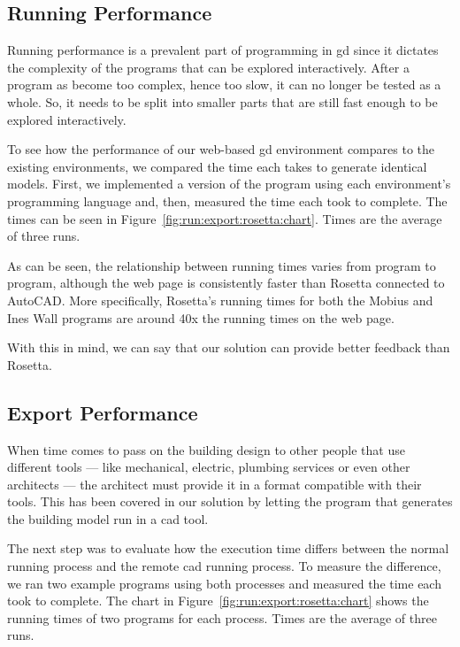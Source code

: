 \subsection{Running Performance}
Running performance is a prevalent part of programming in \gls{gd} since it dictates the complexity of the programs that can be explored interactively.
After a program as become too complex, hence too slow, it can no longer be tested as a whole.
So, it needs to be split into smaller parts that are still fast enough to be explored interactively.

To see how the performance of our web-based \gls{gd} environment compares to the existing environments, we compared the time each takes to generate identical models.
First, we implemented a version of the program using each environment's programming language and, then, measured the time each took to complete.
The times can be seen in Figure~\ref{fig:run:export:rosetta:chart}.
Times are the average of three runs.

As can be seen, the relationship between running times varies from program to program, although the web page is consistently faster than Rosetta connected to AutoCAD.
More specifically, Rosetta's running times for both the Mobius and Ines Wall programs are around 40x the running times on the web page.

With this in mind, we can say that our solution can provide better feedback than Rosetta.



\subsection{Export Performance}
When time comes to pass on the building design to other people that use different tools --- like mechanical, electric, plumbing services or even other architects --- the architect must provide it in a format compatible with their tools.
This has been covered in our solution by letting the program that generates the building model run in a \gls{cad} tool.

The next step was to evaluate how the execution time differs between the normal running process and the remote \gls{cad} running process.
To measure the difference, we ran two example programs using both processes and measured the time each took to complete.
The chart in Figure~\ref{fig:run:export:rosetta:chart} shows the running times of two programs for each process.
Times are the average of three runs.

